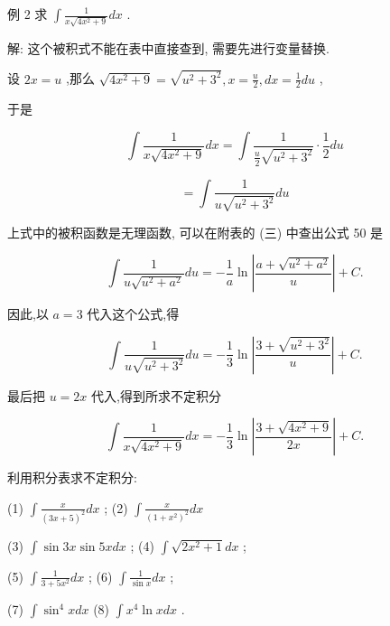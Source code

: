 \documentclass[lang=cn,newtx,10pt,scheme=chinese]{elegantbook}
\begin{document}
例 2 求 \(\int \frac{1}{x\sqrt{4{x}^{2} + 9}}{dx}\) .

解: 这个被积式不能在表中直接查到, 需要先进行变量替换.

设 \({2x} = u\) ,那么 \(\sqrt{4{x}^{2} + 9} = \sqrt{{u}^{2} + {3}^{2}},x = \frac{u}{2},{dx} = \frac{1}{2}{du}\) ,

于是

\[
\int \frac{1}{x\sqrt{4{x}^{2} + 9}}{dx} = \int \frac{1}{\frac{u}{2}\sqrt{{u}^{2} + {3}^{2}}} \cdot \frac{1}{2}{du}
\]

\[
= \int \frac{1}{u\sqrt{{u}^{2} + {3}^{2}}}{du}
\]

上式中的被积函数是无理函数, 可以在附表的 (三) 中查出公式 50 是

\[
\int \frac{1}{u\sqrt{{u}^{2} + {a}^{2}}}{du} = - \frac{1}{a}\ln \left| \frac{a + \sqrt{{u}^{2} + {a}^{2}}}{u}\right| + C.
\]

因此,以 \(a = 3\) 代入这个公式,得

\[
\int \frac{1}{u\sqrt{{u}^{2} + {3}^{2}}}{du} = - \frac{1}{3}\ln \left| \frac{3 + \sqrt{{u}^{2} + {3}^{2}}}{u}\right| + C.
\]

最后把 \(u = {2x}\) 代入,得到所求不定积分

\[
\int \frac{1}{x\sqrt{4{x}^{2} + 9}}{dx} = - \frac{1}{3}\ln \left| \frac{3 + \sqrt{4{x}^{2} + 9}}{2x}\right| + C.
\]

\begin{problemset}[练习]

\item *利用积分表求不定积分:

(1) \(\int \frac{x}{{\left( 3x + 5\right) }^{2}}{dx}\) ; (2) \(\int \frac{x}{{\left( 1 + {x}^{2}\right) }^{2}}{dx}\)

(3) \(\int \sin {3x}\sin {5xdx}\) ; (4) \(\int \sqrt{2{x}^{2} + 1}{dx}\) ;

(5) \(\int \frac{1}{3 + 5{x}^{2}}{dx}\) ; (6) \(\int \frac{1}{\sin x}{dx}\) ;

(7) \(\int {\sin }^{4}{xdx}\) (8) \(\int {x}^{4}\ln {xdx}\) .

\end{problemset}
\end{document}
